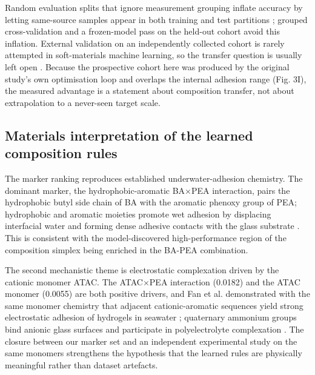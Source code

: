 Random evaluation splits that ignore measurement grouping inflate accuracy by letting same-source samples appear in both training and test partitions \cite{ovadia2019uncertainty,quinonero2009dataset}; grouped cross-validation and a frozen-model pass on the held-out cohort avoid this inflation. External validation on an independently collected cohort is rarely attempted in soft-materials machine learning, so the transfer question is usually left open \cite{mouret2017realitygap,shen2021ood,gulrajani2021domain}. Because the prospective cohort here was produced by the original study's own optimisation loop and overlaps the internal adhesion range (Fig. 3I), the measured advantage is a statement about composition transfer, not about extrapolation to a never-seen target scale.

\subsection{Materials interpretation of the learned composition rules}

The marker ranking reproduces established underwater-adhesion chemistry. The dominant marker, the hydrophobic-aromatic BA$\times$PEA interaction, pairs the hydrophobic butyl side chain of BA with the aromatic phenoxy group of PEA; hydrophobic and aromatic moieties promote wet adhesion by displacing interfacial water and forming dense adhesive contacts with the glass substrate \cite{cai2021bioadhesives,maier2015saltdisplacement,narayanan2021underwater,zhang2020catechol,lee2007mussel,waite2017mussel}. This is consistent with the model-discovered high-performance region of the composition simplex being enriched in the BA-PEA combination.

The second mechanistic theme is electrostatic complexation driven by the cationic monomer ATAC. The ATAC$\times$PEA interaction (0.0182) and the ATAC monomer (0.0055) are both positive drivers, and Fan et al. demonstrated with the same monomer chemistry that adjacent cationic-aromatic sequences yield strong electrostatic adhesion of hydrogels in seawater \cite{fan2019cationicaromatic}; quaternary ammonium groups bind anionic glass surfaces and participate in polyelectrolyte complexation \cite{zhao2016polyelectrolyte,gong2010doublenetwork,wei2013musseldervied,wang2021selfcoacervation}. The closure between our marker set and an independent experimental study on the same monomers strengthens the hypothesis that the learned rules are physically meaningful rather than dataset artefacts.

